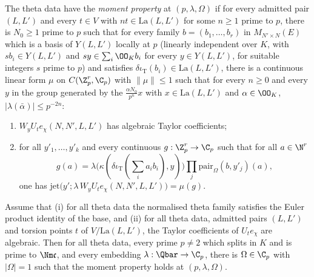 \begin{definition}\label{pf:rows:defmoments}
The theta data have the \emph{moment property} at $(p,\lambda,\Omega)$ if for every admitted pair $(L,L')$ and every $t\in V$
with $nt\in\mathrm{La}(L,L')$ for some $n\ge1$ prime to $p$, there is $N_0\ge1$ prime to $p$ such that for every family
$b=(b_1,\dots,b_r)$ in $M_{N'\times N}(E)$ which is a basis of $Y(L,L')$ locally at $p$ (linearly independent over $K$, with
$sb_i\in Y(L,L')$ and $sy\in\sum_i\OO_Kb_i$ for every $y\in Y(L,L')$, for suitable integers $s$ prime to $p$) and satisfies
$\delta\iota_{\mathrm T}(b_i)\in\mathrm{La}(L,L')$, there is
a continuous linear form $\mu$ on $C(\Z_p^r,\C_p)$ with $\|\mu\|\le1$ such that for every $n\ge0$ and every $y$ in the group
generated by the $\frac{\alpha N_0}{p^n}x$ with $x\in\mathrm{La}(L,L')$ and $\alpha\in\OO_K$, $|\lambda(\bar\alpha)|\le p^{-2n}$:
\begin{enumerate}[label=(\alph*)]
\item $W_yU_te_\chi(N,N',L,L')$ has algebraic Taylor coefficients;
\item for all $y'_1,\dots,y'_k$ and every continuous $g:\Z_p^r\to\C_p$ such that for all $a\in\N^r$
\[
g(a)=\lambda\bigl(\kappa(\delta\iota_{\mathrm T}(\textstyle\sum_ia_ib_i),y)\bigr)\prod_j\mathrm{pair}_\Omega(b,y'_j)(a),
\]
one has $\mathrm{jet}\bigl(y';\lambda\,W_yU_te_\chi(N,N',L,L')\bigr)=\mu(g)$.
\end{enumerate}
\end{definition}

\begin{theorem}\label{pf:rows:unitperiods}
Assume that (i) for all theta data the normalised theta family satisfies the Euler product identity of the base, and (ii) for
all theta data, admitted pairs $(L,L')$ and torsion points $t$ of $V/\mathrm{La}(L,L')$, the Taylor coefficients of $U_te_\chi$ are
algebraic. Then for all theta data, every prime $p\ne2$ which splits in $K$ and is prime to $\Nm\mathfrak c$, and every embedding
$\lambda:\Qbar\to\C_p$, there is $\Omega\in\C_p$ with $|\Omega|=1$ such that the moment property holds at $(p,\lambda,\Omega)$.
\end{theorem}

